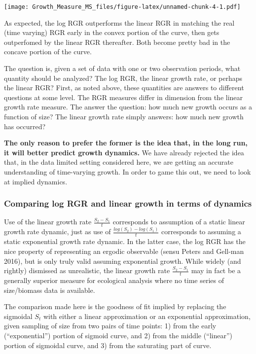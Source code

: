 \documentclass[]{article}
\begin{document}
\texttt{[image: Growth\_Measure\_MS\_files/figure-latex/unnamed-chunk-4-1.pdf]}

As expected, the log RGR outperforms the linear RGR in matching the real
(time varying) RGR early in the convex portion of the curve, then gets
outperfomed by the linear RGR thereafter. Both become pretty bad in the
concave portion of the curve.

The question is, given a set of data with one or two observation
periods, what quantity should be analyzed? The log RGR, the linear
growth rate, or perhaps the linear RGR? First, as noted above, these
quantities are answers to different questions at some level. The RGR
measures differ in dimension from the linear growth rate measure. The
answer the question: how much new growth occurs as a function of size?
The linear growth rate simply answers: how much new growth has occurred?

\textbf{The only reason to prefer the former is the idea that, in the
long run, it will better predict growth dynamics.} We have already
rejected the idea that, in the data limited setting considered here, we
are getting an accurate understanding of time-varying growth. In order
to game this out, we need to look at implied dynamics.

\subsubsection{Comparing log RGR and linear growth in terms of
dynamics}\label{comparing-log-rgr-and-linear-growth-in-terms-of-dynamics}

Use of the linear growth rate \(\frac{S_2 - S_1}{t}\) corresponds to
assumption of a static linear growth rate dynamic, just as use of
\(\frac{log(S_2) - log(S_1)}{t}\) corresponds to assuming a static
exponential growth rate dynamic. In the latter case, the log RGR has the
nice property of representing an ergodic observable (sensu Peters and
Gell-man 2016), but is only truly valid assuming exponential growth.
While widely (and rightly) dismissed as unrealistic, the linear growth
rate \(\frac{S_2 - S_1}{t}\) may in fact be a generally superior measure
for ecological analysis where no time series of size/biomass data is
available.

The comparison made here is the goodness of fit implied by replacing the
sigmoidal \(S_t\) with either a linear approximation or an exponential
approximation, given sampling of size from two pairs of time points: 1)
from the early (``exponential'') portion of sigmoid curve, and 2) from
the middle (``linear'') portion of sigmoidal curve, and 3) from the
saturating part of curve.
\end{document}
